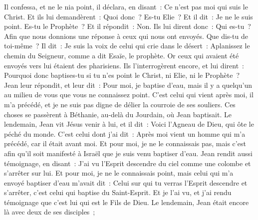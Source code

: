 \begin{multicols}{2}
Il confessa, et ne le nia point, il déclara, en disant~: Ce n'est pas moi qui suis le Christ.
Et ils lui demandèrent~: Quoi donc~? Es-tu Elie~? Et il dit~: Je ne le suis point. Es-tu le Prophète~? Et il répondit~: Non.
Ils lui dirent donc~: Qui es-tu~? Afin que nous donnions une réponse à ceux qui nous ont envoyés. Que dis-tu de toi-même~?
Il dit~: Je suis la voix de celui qui crie dans le désert~: Aplanissez le chemin du Seigneur, comme a dit Esaïe, le prophète.
Or ceux qui avaient été envoyés vers lui étaient des pharisiens.
Ils l'interrogèrent encore, et lui dirent~: Pourquoi donc baptises-tu si tu n'es point le Christ, ni Elie, ni le Prophète~?
Jean leur répondit, et leur dit~: Pour moi, je baptise d'eau, mais il y a quelqu'un au milieu de vous que vous ne connaissez point.
C'est celui qui vient après moi, il m'a précédé, et je ne suis pas digne de délier la courroie de ses souliers.
Ces choses se passèrent à Béthanie, au-delà du Jourdain, où Jean baptisait.
Le lendemain, Jean vit Jésus venir à lui, et il dit~: Voici l'Agneau de Dieu, qui ôte le péché du monde.
C'est celui dont j'ai dit~: Après moi vient un homme qui m'a précédé, car il était avant moi.
Et pour moi, je ne le connaissais pas, mais c'est afin qu'il soit manifesté à Israël que je suis venu baptiser d'eau.
Jean rendit aussi témoignage, en disant~: J'ai vu l'Esprit descendre du ciel comme une colombe et s'arrêter sur lui.
Et pour moi, je ne le connaissais point, mais celui qui m'a envoyé baptiser d'eau m'avait dit~: Celui sur qui tu verras l'Esprit descendre et s'arrêter, c'est celui qui baptise du Saint-Esprit.
Et je l'ai vu, et j'ai rendu témoignage que c'est lui qui est le Fils de Dieu.
Le lendemain, Jean était encore là avec deux de ses disciples~;

\end{multicols}
